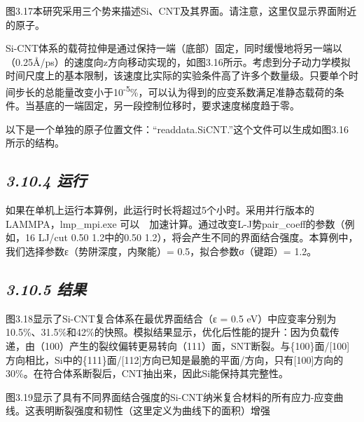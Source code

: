 图3.17本研究采用三个势来描述Si、CNT及其界面。请注意，这里仅显示界面附近的原子。

Si-CNT体系的载荷拉伸是通过保持一端（底部）固定，同时缓慢地将另一端以（0.25Å/ps）的速度向z方向移动实现的，如图3.16所示。考虑到分子动力学模拟时间尺度上的基本限制，该速度比实际的实验条件高了许多个数量级。只要单个时间步长的总能量改变小于10\textsuperscript{-5}\%，可以认为得到的应变系数满足准静态载荷的条件。当基底的一端固定，另一段控制位移时，要求速度梯度趋于零。




以下是一个单独的原子位置文件：``readdata.SiCNT.''这个文件可以生成如图3.16所示的结构。



\hypertarget{ux8fd0ux884c-1}{%
\subsection{\texorpdfstring{\emph{3.10.4
运行}}{3.10.4 运行}}\label{ux8fd0ux884c-1}}

如果在单机上运行本算例，此运行时长将超过5个小时。采用并行版本的LAMMPA，lmp\_mpi.exe
可以　加速计算。通过改变L-J势pair\_coeff的参数（例如，16 LJ/cut 0.50
1.2中的0.50
1.2），将会产生不同的界面结合强度。本算例中，我们选择参数ε（势阱深度，内聚能）=
0.5，拟合参数σ（键距）= 1.2。

\hypertarget{ux7ed3ux679c-9}{%
\subsection{\texorpdfstring{\emph{3.10.5
结果}}{3.10.5 结果}}\label{ux7ed3ux679c-9}}

图3.18显示了Si-CNT复合体系在最优界面结合（ε = 0.5
eV）中应变率分别为10.5\%、31.5\%和42\%的快照。模拟结果显示，优化后性能的提升：因为负载传递，由（100）产生的裂纹偏转更易转向（111）面，SNT断裂。与\{100\}面/{[}100{]}方向相比，Si中的\{111\}面/{[}112{]}方向已知是最脆的平面/方向，只有{[}100{]}方向的30\%。在符合体系断裂后，CNT抽出来，因此Si能保持其完整性。

图3.19显示了具有不同界面结合强度的Si-CNT纳米复合材料的所有应力-应变曲线。这表明断裂强度和韧性（这里定义为曲线下的面积）增强

